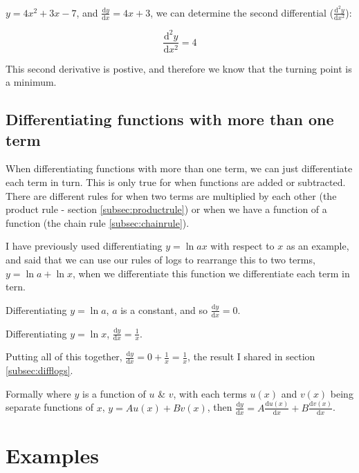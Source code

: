 \documentclass[
]{book}
\begin{document}
\(y=4x^2+3x-7\), and \(\frac{\textrm{d}y}{\textrm{d}x} = 4x+3\), we can determine the second differential (\(\frac{\textrm{d}^2y}{\textrm{d}x^2}\)):

\begin{equation*}
\frac{\textrm{d}^2y}{\textrm{d}x^2} = 4
\end{equation*}

This second derivative is postive, and therefore we know that the turning point is a minimum.

\hypertarget{differentiating-functions-with-more-than-one-term}{%
\subsection{Differentiating functions with more than one term}\label{differentiating-functions-with-more-than-one-term}}

When differentiating functions with more than one term, we can just differentiate each term in turn. This is only true for when functions are added or subtracted. There are different rules for when two terms are multiplied by each other (the product rule - section \ref{subsec:productrule}) or when we have a function of a function (the chain rule \ref{subsec:chainrule}).

I have previously used differentiating \(y= \ln ax\) with respect to \(x\) as an example, and said that we can use our rules of logs to rearrange this to two terms, \(y= \ln a + \ln x\), when we differentiate this function we differentiate each term in tern.

Differentiating \(y=\ln a\), \(a\) is a constant, and so \(\frac{\textrm{d}y}{\textrm{d}x}=0\).

Differentiating \(y = \ln x\), \(\frac{\textrm{d}y}{\textrm{d}x}=\frac{1}{x}\).

Putting all of this together, \(\frac{\textrm{d}y}{\textrm{d}x}=0+ \frac{1}{x}= \frac{1}{x}\), the result I shared in section \ref{subsec:difflogs}.

Formally where \(y\) is a function of \(u\) \& \(v\), with each terms \(u(x)\) and \(v(x)\) being separate functions of \(x\), \(y = Au(x) + Bv(x)\), then \(\frac{\textrm{d}y}{\textrm{d}x}=A\frac{\textrm{d}u(x)}{\textrm{d}x} + B\frac{\textrm{d}v(x)}{\textrm{d}x}\).

\hypertarget{examples-1}{%
\section{Examples}\label{examples-1}}
\end{document}

